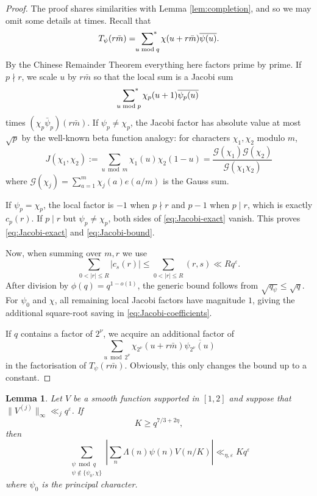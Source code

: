 \documentclass[12pt, oneside]{amsart}
\newtheorem{lem}[prop]{Lemma}
\theoremstyle{definition}
\newcommand{\mc}{\mathcal}
\newcommand{\ol}{\overline}
\newcommand{\leqs}{\leqslant }
\newcommand{\geqs}{\geqslant }
\newcommand{\eps}{\varepsilon}
\newcommand{\1}{\mathds{1}}
\begin{document}
\begin{proof}The proof shares similarities with Lemma \ref{lem:completion}, and so we may omit some details at times. Recall that 
\[
T_\psi(r\bar m)=\sideset{}{^*}\sum_{u\bmod q}\chi(u+r\bar m)\ol{\psi(u)}. 
\]
By the Chinese Remainder Theorem everything here factors prime by prime.  If $p\nmid r$, we scale $u$ by
$r\bar m$ so that the local sum is a Jacobi sum 
\[
\sideset{}{^*}\sum_{u\bmod p}\chi_p(u+1)\ol{\psi_p(u)}
\]
times
$(\chi_p\bar\psi_p)(r\bar m)$.  If $\psi_p\ne\chi_p$, the Jacobi factor has
absolute value at most $\sqrt p$ by the well-known beta function analogy: for characters $\chi_1,\chi_2$ modulo $m$,
\[
J(\chi_1,\chi_2):=\sum_{u\bmod m} \chi_1(u)\chi_2(1-u)=\frac{\mc{G}(\chi_1)\mc{G}(\chi_2)}{\mc{G}(\chi_1\chi_2)}
\]
where $\mc{G}(\chi_j)=\sum_{a=1}^m\chi_j(a)e(a/m)$ is the Gauss sum. 

If $\psi_p=\chi_p$, the local factor is
$-1$ when $p\nmid r$ and $p-1$ when $p\mid r$, which is exactly $c_p(r)$.
If $p\mid r$ but $\psi_p\ne\chi_p$, both sides of
\eqref{eq:Jacobi-exact} vanish.  This proves \eqref{eq:Jacobi-exact} and
\eqref{eq:Jacobi-bound}.

Now, when summing over $m,r$ we use 
\begin{equation*}
 \sum_{0<|r|\leqs R}|c_s(r)|\leqs
 \sum_{0<|r|\leqs R}(r,s)\ll Rq^\eps.
\end{equation*}
After division by $\phi(q)=q^{1-o(1)}$, the generic bound follows from
$\sqrt{q_\psi}\leqs\sqrt q$.  For $\psi_0$ and $\chi$, all remaining local
Jacobi factors have magnitude $1$, giving the additional square-root saving
in \eqref{eq:Jacobi-coefficients}.  

If $q$ contains a factor of  $2^\nu$, we acquire an additional factor of 
\[
\sum_{u\bmod 2^\nu}\chi_{2^\nu}(u+r\bar m)\ol{\psi_{2^\nu}(u)}
\]
in the factorisation of $T_\psi(r\bar m)$. Obviously, this only changes the bound up to a constant. 
\end{proof}



\begin{lem}
\label{lem:prime-L1}
Let $V$ be a
smooth function supported in $[1,2]$ and suppose that
$\|V^{(j)}\|_\infty\ll_j q^{\eps}$.  If
\begin{equation*}
 K\geqs q^{7/3+2\eta},
\end{equation*}
then
\begin{equation*}
 \sum_{\substack{\psi\bmod q\\\psi\notin\{\psi_0,\chi\}}}
 \left|\sum_n\Lambda(n)\psi(n)V(n/K)\right|
 \ll_{\eta,\eps}Kq^\eps
\end{equation*}
where $\psi_0$ is the principal character. 

\end{lem}
\end{document}
